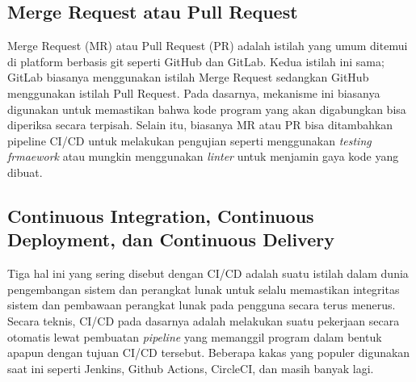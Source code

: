 \subsection{Merge Request atau Pull Request}

Merge Request (MR) atau Pull Request (PR) adalah istilah yang umum ditemui di platform berbasis git seperti GitHub dan GitLab. Kedua istilah ini sama; GitLab biasanya menggunakan istilah Merge Request sedangkan GitHub menggunakan istilah Pull Request. Pada dasarnya, mekanisme ini biasanya digunakan untuk memastikan bahwa kode program yang akan digabungkan bisa diperiksa secara terpisah. Selain itu, biasanya MR atau PR bisa ditambahkan pipeline CI/CD untuk melakukan pengujian seperti menggunakan \textit{testing frmaework} atau mungkin menggunakan \textit{linter} untuk menjamin gaya kode yang dibuat. 

\subsection{Continuous Integration, Continuous Deployment, dan Continuous Delivery}

Tiga hal ini yang sering disebut dengan CI/CD adalah suatu istilah dalam dunia pengembangan sistem dan perangkat lunak untuk selalu memastikan integritas sistem dan pembawaan perangkat lunak pada pengguna secara terus menerus. Secara teknis, CI/CD pada dasarnya adalah melakukan suatu pekerjaan secara otomatis lewat pembuatan \textit{pipeline} yang memanggil program dalam bentuk apapun dengan tujuan CI/CD tersebut. Beberapa kakas yang populer digunakan saat ini seperti Jenkins, Github Actions, CircleCI, dan masih banyak lagi.

